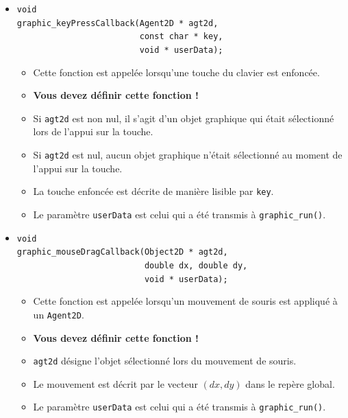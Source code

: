 \documentclass[12pt]{article}
\begin{document}
\begin{itemize}
\begin{itemize}
      \item \textbf{Vous devez d\'efinir cette fonction !}
      \item Le param\`etre \verb!userData! est celui qui a \'et\'e
            transmis \`a \verb!graphic_run()!.
      \end{itemize}
\item \verb!void! \\
      \verb!graphic_keyPressCallback(Agent2D * agt2d,! \\
      \verb!                         const char * key,! \\
      \verb!                         void * userData);!
      \begin{itemize}
      \item Cette fonction est appel\'ee lorsqu'une touche du clavier est
            enfonc\'ee.
      \item \textbf{Vous devez d\'efinir cette fonction !}
      \item Si \verb!agt2d! est non nul, il s'agit d'un objet graphique
            qui \'etait s\'electionn\'e lors de l'appui sur la touche.
      \item Si \verb!agt2d! est nul, aucun objet graphique n'\'etait
            s\'electionn\'e au moment de l'appui sur la touche.
      \item La touche enfonc\'ee est d\'ecrite de mani\`ere lisible par
            \verb!key!.
      \item Le param\`etre \verb!userData! est celui qui a \'et\'e
            transmis \`a \verb!graphic_run()!.
      \end{itemize}
\item \verb!void! \\
      \verb!graphic_mouseDragCallback(Object2D * agt2d,! \\
      \verb!                          double dx, double dy,! \\
      \verb!                          void * userData);!
      \begin{itemize}
      \item Cette fonction est appel\'ee lorsqu'un mouvement de souris
            est appliqu\'e \`a un \verb!Agent2D!.
      \item \textbf{Vous devez d\'efinir cette fonction !}
      \item \verb!agt2d! d\'esigne l'objet s\'electionn\'e lors du
            mouvement de souris.
      \item Le mouvement est d\'ecrit par le vecteur $(dx,dy)$ dans le
            rep\`ere global.
      \item Le param\`etre \verb!userData! est celui qui a \'et\'e
            transmis \`a \verb!graphic_run()!.
      \end{itemize}
\end{itemize}
\end{document}
